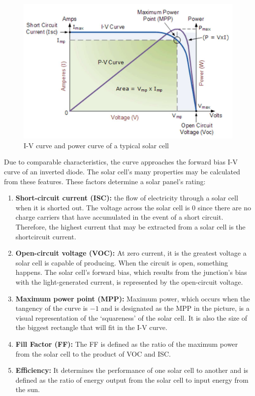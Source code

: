 		\begin{figure}[h]
			\centering
			\includegraphics[width=0.8\columnwidth]{images/theory2.png}
			\caption{I-V curve and power curve of a typical solar cell}
			\label{fig:2}
		\end{figure}

		Due to comparable characteristics, the curve approaches the forward bias I-V curve of an inverted diode. The solar cell's many properties may be calculated from these features. These factors determine a solar panel's rating:

		\begin{enumerate}
			\item \textbf{Short-circuit current (ISC):} the flow of electricity through a solar cell when it is shorted out. The voltage across the solar cell is 0 since there are no charge carriers that have accumulated in the event of a short circuit. Therefore, the highest current that may be extracted from a solar cell is the shortcircuit current.
			\item \textbf{Open-circuit voltage (VOC):} At zero current, it is the greatest voltage a solar cell is capable of producing. When the circuit is open, something happens. The solar cell's forward bias, which results from the junction's bias with the light-generated current, is represented by the open-circuit voltage.
			\item \textbf{Maximum power point (MPP):} Maximum power, which occurs when the tangency of the curve is $-1$ and is designated as the MPP in the picture, is a visual representation of the `squareness' of the solar cell. It is also the size of the biggest rectangle that will fit in the I-V curve.
			\item \textbf{Fill Factor (FF):} The FF is defined as the ratio of the maximum power from the solar cell to the product of VOC and ISC.
			\item \textbf{Efficiency:} It determines the performance of one solar cell to another and is defined as the ratio of energy output from the solar cell to input energy from the sun.
		\end{enumerate}

